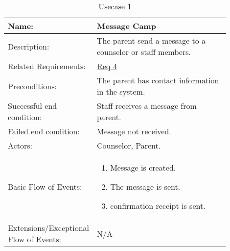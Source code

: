 \documentclass[11pt]{article}
\begin{document}
\begin{table}[!htb]
\caption{Usecase 1}
\label{des:message camp}	
\begin{center}
\begin{tabular}{p{0.30\linewidth}p{0.60\linewidth}}
	Name: & Message Camp\\\hline
	Description: & The parent send a message to a counselor or staff members.\\\hline
	Related Requirements:& \hyperlink{Req4}{Req 4}\\\hline
	Preconditions:& The parent has contact information in the system.\\\hline
	Successful end condition:& Staff receives a message from parent.\\\hline
	Failed end condition:& Message not received. \\\hline
	Actors:& Counselor, Parent.\\\hline
	Basic Flow of Events: & \begin{enumerate}[topsep=0pt]
		\item Message is created.
		\item The message is sent.
		\item confirmation receipt is sent.
	\end{enumerate}\\\hline
	Extensions/Exceptional Flow of Events: & \vspace*{.25em}  N/A
\end{tabular}
\end{center}
\end{table}
\end{document}
